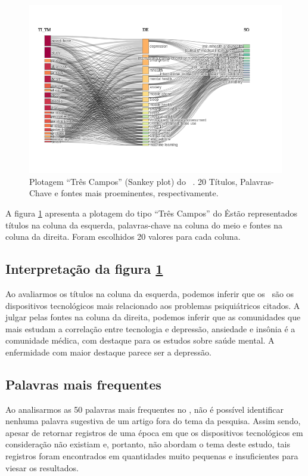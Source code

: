 \begin{figure}
    \centering
    \includegraphics[angle=0,width=1\textwidth]{experiments/GustavoMacCar/AnaliseBibliometrica/PsychDiseasesTech/sankey.png}
    \caption{Plotagem ``Três Campos'' (Sankey plot) do \dataset\ . 20 Títulos, Palavras-Chave e fontes mais proeminentes, respectivamente.}
    \label{fig:sankey:psych}
\end{figure}

A figura \ref{fig:sankey:psych} apresenta a plotagem do tipo ``Três Campos'' do \dataset\. Estão representados títulos na coluna da esquerda, palavras-chave na coluna do meio e fontes na coluna da direita. Foram escolhidos 20 valores para cada coluna.

\subsection{Interpretação da figura \ref{fig:sankey:psych}}
Ao avaliarmos os títulos na coluna da esquerda, podemos inferir que os \smartphones\ são os dispositivos tecnológicos mais relacionado aos problemas psiquiátricos citados. A julgar pelas fontes na coluna da direita, podemos inferir que as comunidades que mais 
estudam a correlação entre tecnologia e depressão, ansiedade e insônia é a comunidade médica, com destaque para os estudos sobre saúde mental. A enfermidade com maior destaque parece ser a depressão.

\subsection{Palavras mais frequentes}

Ao analisarmos as 50 palavras mais frequentes no \dataset, não é possível identificar nenhuma palavra sugestiva de um artigo fora do tema da pesquisa. Assim sendo, apesar de retornar registros de uma época em que os dispositivos tecnológicos em consideração não existiam e, portanto,
não abordam o tema deste estudo, tais registros foram encontrados em quantidades muito pequenas e insuficientes para viesar os resultados.

